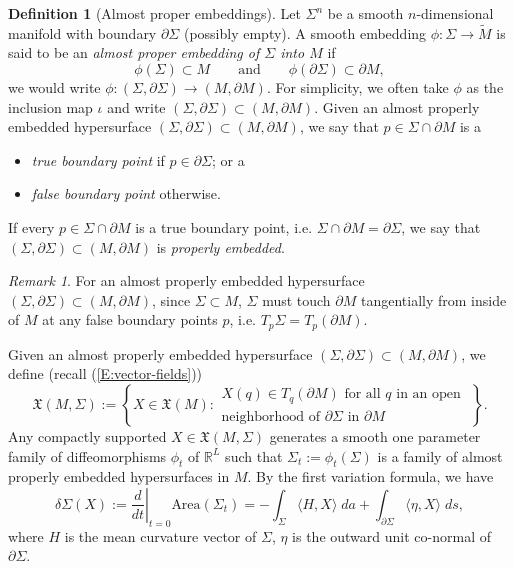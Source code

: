 \documentclass[10pt]{amsart}
\theoremstyle{definition}
\newtheorem{definition}[theorem]{Definition}
\theoremstyle{remark}
\newtheorem{remark}[theorem]{Remark}
\numberwithin{equation}{section}
\newcommand{\Si}{\Sigma}
\newcommand{\tM}{\widetilde{M}}
\begin{document}
\begin{definition}[Almost proper embeddings]
\label{D:proper}
Let $\Sigma^n$ be a smooth $n$-dimensional manifold with boundary $\partial \Sigma$ (possibly empty). A smooth embedding $\phi:\Sigma \to \tM$ is said to be an \emph{almost proper embedding of $\Sigma$ into $M$} if
\[ \phi(\Sigma) \subset M \qquad \text{and} \qquad \phi(\partial \Sigma) \subset \partial M,\] 
we would write $\phi:(\Sigma,\partial \Sigma) \to (M,\partial M)$. For simplicity, we often take $\phi$ as the inclusion map $\iota$ and write $(\Sigma,\partial \Sigma) \subset (M,\partial M)$. Given an almost properly embedded hypersurface $(\Sigma,\partial \Sigma) \subset (M,\partial M)$, we say that $p \in \Sigma \cap \partial M$ is a 
\begin{itemize}
\item \emph{true boundary point} if $p \in \partial \Sigma$; or a
\item \emph{false boundary point} otherwise.
\end{itemize}
If every $p \in \Sigma \cap \partial M$ is a true boundary point, i.e. $\Sigma \cap \partial M=\partial \Sigma$, we say that $(\Sigma,\partial \Sigma) \subset (M,\partial M)$ is \emph{properly embedded}.
\end{definition}

\begin{remark}
\label{R:false-boundary}
For an almost properly embedded hypersurface $(\Sigma,\partial \Sigma) \subset (M,\partial M)$, since $\Sigma \subset M$, $\Sigma$ must touch $\partial M$ tangentially from inside of $M$ at any false boundary points $p$, i.e. $T_p \Si=T_p(\partial M)$. 
\end{remark}

Given an almost properly embedded hypersurface $(\Sigma,\partial \Sigma) \subset (M,\partial M)$, we define (recall (\ref{E:vector-fields}))
\[ \mathfrak{X}(M,\Sigma):=\left\{ X \in \mathfrak{X}(M): \begin{array}{c}
X(q) \in T_q(\partial M) \text{ for all $q$ in an open }\\
\text{neighborhood of $\partial \Sigma$ in $\partial M$} \end{array} \right\}.\]
Any compactly supported $X \in \mathfrak{X}(M,\Sigma)$ generates a smooth one parameter family of diffeomorphisms $\phi_t$ of $\mathbb{R}^L$ such that $\Sigma_t:=\phi_t(\Sigma)$ is a family of almost properly embedded hypersurfaces in $M$.
By the first variation formula, we have
\begin{equation}
\label{E:1st-variation-area}
\delta \Sigma(X) := \left. \frac{d}{dt} \right|_{t=0} \textrm{Area}(\Sigma_t) = -\int_\Sigma \langle H,X \rangle \; da + \int_{\partial \Sigma} \langle \eta,X \rangle \; ds,
\end{equation}
where $H$ is the mean curvature vector of $\Sigma$, $\eta$ is the outward unit co-normal of $\partial \Sigma$.
\end{document}
